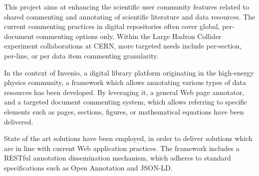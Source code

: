 
This project aims at enhancing the scientific user community features related
to shared commenting and annotating of scientific literature and data
resources.  The current commenting practices in digital repositories often
cover global, per-document commenting options only. Within the Large Hadron
Collider experiment collaborations at CERN, more targeted needs include
per-section, per-line, or per data item commenting granularity.

In the context of Invenio, a digital library platform originating in the
high-energy physics community, a framework which allows annotating various
types of data resources has been developed. By leveraging it, a general Web
page annotator, and a targeted document commenting system, which allows
referring to specific elements such as pages, sections, figures, or
mathematical equations have been delivered.

State of the art solutions have been employed, in order to deliver solutions
which are in line with current Web application practices. The framework
includes a RESTful annotation dissemination mechanism, which adheres to
standard specifications such as Open Annotation and JSON-LD.
